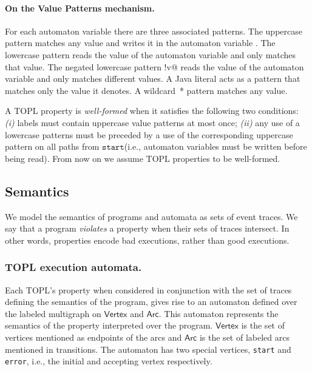 \documentclass{sigplanconf}[10pt] %
\newcommand{\set}[1]{\ensuremath{\mathsf{#1}}}
\newcommand{\start}{\ensuremath{\mathtt{start}}\xspace}
\begin{document}
\paragraph{On the Value Patterns mechanism.}
For each automaton variable \Verb@v@ there are three associated patterns.
The uppercase pattern \Verb@V@ matches any value and writes it in the automaton variable \Verb@v@.
The lowercase pattern \Verb@v@ reads the value of the automaton variable \Verb@v@ and only matches that value.
The negated lowercase pattern \Verb@!v@ reads the value of the automaton variable \Verb@v@ and only matches different values.
A Java literal acts as a pattern that matches only the value it denotes.
A wildcard~* pattern matches any value.

\smallskip
A TOPL property is \emph{well-formed} when it satisfies the following two conditions:
{\em (i)} labels must contain uppercase value patterns at most once; {\em (ii)}
any use of a lowercase patterns must be preceded by a use of the corresponding uppercase pattern on all paths from \start  (i.e., automaton variables must be written before being read).
%
From now on we assume TOPL properties to be well-formed.



\subsection{Semantics}\label{sec:semantics} %
We model the semantics of programs and automata as sets of event traces.
We say that a program \emph{violates} a property when their sets of traces intersect.
In other words, properties encode bad executions, rather than good executions.

\subsubsection{TOPL execution automata.}
\newcommand{\World}{ExecState}

Each TOPL's property when considered in conjunction with the set of traces defining the semantics of the program,
gives rise to an automaton defined over the labeled multigraph  on $\set{Vertex}$ and $\set{Arc}$. This automaton represents the 
semantics of the property interpreted over the program.
$\set{Vertex}$ is the set of vertices mentioned as endpoints of the arcs and $\set{Arc}$ is the set of labeled arcs mentioned in transitions. The automaton has two special vertices, {\tt start} and {\tt error},  i.e., the initial and accepting vertex respectively. 
\end{document}
